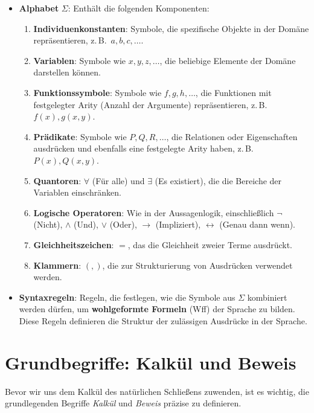 \documentclass[main.tex]{subfiles}
\begin{document}
\begin{itemize}
    \item \textbf{Alphabet} \( \Sigma \): Enthält die folgenden Komponenten:
    \begin{enumerate}
        \item \textbf{Individuenkonstanten}: Symbole, die spezifische Objekte in der Domäne repräsentieren, z.\,B.\ \( a, b, c, \ldots \).
        \item \textbf{Variablen}: Symbole wie \( x, y, z, \ldots \), die beliebige Elemente der Domäne darstellen können.
        \item \textbf{Funktionssymbole}: Symbole wie \( f, g, h, \ldots \), die Funktionen mit festgelegter Arity (Anzahl der Argumente) repräsentieren, z.\,B.\ \( f(x), g(x, y) \).
        \item \textbf{Prädikate}: Symbole wie \( P, Q, R, \ldots \), die Relationen oder Eigenschaften ausdrücken und ebenfalls eine festgelegte Arity haben, z.\,B.\ \( P(x), Q(x, y) \).
        \item \textbf{Quantoren}: \( \forall \) (Für alle) und \( \exists \) (Es existiert), die die Bereiche der Variablen einschränken.
        \item \textbf{Logische Operatoren}: Wie in der Aussagenlogik, einschließlich \( \neg \) (Nicht), \( \land \) (Und), \( \lor \) (Oder), \( \rightarrow \) (Impliziert), \( \leftrightarrow \) (Genau dann wenn).
        \item \textbf{Gleichheitszeichen}: \( = \), das die Gleichheit zweier Terme ausdrückt.
        \item \textbf{Klammern}: \( (, ) \), die zur Strukturierung von Ausdrücken verwendet werden.
    \end{enumerate}
    
    \item \textbf{Syntaxregeln}: Regeln, die festlegen, wie die Symbole aus \( \Sigma \) kombiniert werden dürfen, um \textbf{wohlgeformte Formeln} (Wff) der Sprache zu bilden. Diese Regeln definieren die Struktur der zulässigen Ausdrücke in der Sprache.
\end{itemize}

\section{Grundbegriffe: Kalkül und Beweis}

Bevor wir uns dem Kalkül des natürlichen Schließens zuwenden, ist es wichtig, die grundlegenden Begriffe \textit{Kalkül} und \textit{Beweis} präzise zu definieren.
\end{document}
